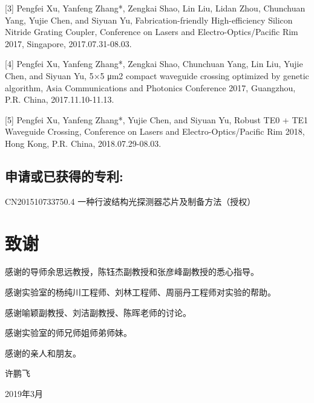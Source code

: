[3] Pengfei Xu, Yanfeng Zhang*, Zengkai Shao, Lin Liu, Lidan Zhou, Chunchuan Yang, Yujie Chen, and Siyuan Yu, Fabrication-friendly High-efficiency Silicon Nitride Grating Coupler, Conference on Lasers and Electro-Optics/Pacific Rim 2017, Singapore, 2017.07.31-08.03.

[4] Pengfei Xu, Yanfeng Zhang*, Zengkai Shao, Chunchuan Yang, Lin Liu, Yujie Chen, and Siyuan Yu, 5×5 μm2 compact waveguide crossing optimized by genetic algorithm, Asia Communications and Photonics Conference 2017, Guangzhou, P.R. China, 2017.11.10-11.13.

[5] Pengfei Xu, Yanfeng Zhang*, Yujie Chen, and Siyuan Yu, Robust TE0 + TE1 Waveguide Crossing, Conference on Lasers and Electro-Optics/Pacific Rim 2018, Hong Kong, P.R. China, 2018.07.29-08.03.

\section*{申请或已获得的专利:}

CN201510733750.4 一种行波结构光探测器芯片及制备方法（授权）


\chapter[致谢]{致\quad 谢}%
\thispagestyle{noheaderstyle}%

感谢的导师余思远教授，陈钰杰副教授和张彦峰副教授的悉心指导。

感谢实验室的杨纯川工程师、刘林工程师、周丽丹工程师对实验的帮助。

感谢喻颖副教授、刘洁副教授、陈晖老师的讨论。

感谢实验室的师兄师姐师弟师妹。

感谢的亲人和朋友。
\begin{flushright}
许鹏飞

2019年3月 
\end{flushright}

\cleardoublepage[plain]%

